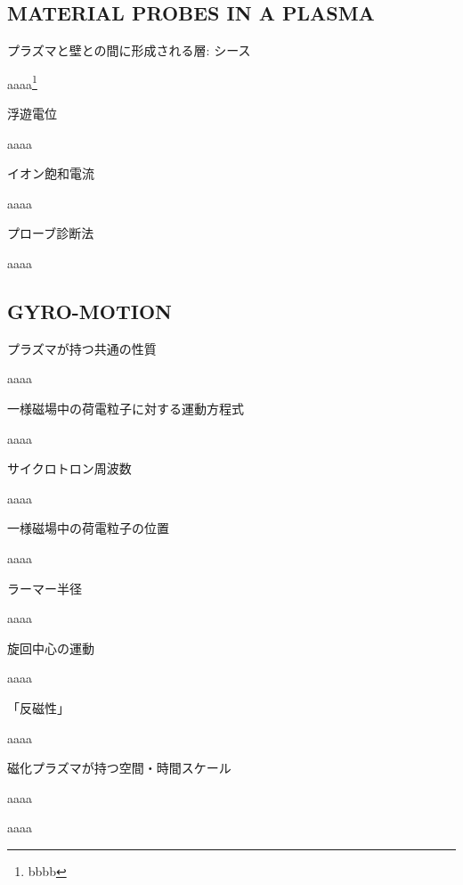 \documentclass[10pt,dvipdfmx,landscape]{jsarticle}
\begin{document}
\subsection{MATERIAL PROBES IN A PLASMA}
\begin{screen}
	プラズマと壁との間に形成される層: シース
\end{screen}
%
aaaa\footnote{bbbb} 
\newpage
\begin{screen}
	浮遊電位
\end{screen}
%
aaaa  
\newpage
\begin{screen}
	イオン飽和電流
\end{screen}
%
aaaa  
\newpage
\begin{screen}
	プローブ診断法
\end{screen}
%
aaaa  
\newpage
\setcounter{section}{2}
\subsection{GYRO-MOTION}
\begin{screen}
	プラズマが持つ共通の性質
\end{screen}
%
aaaa
\newpage
\begin{screen}
	一様磁場中の荷電粒子に対する運動方程式
\end{screen}
%
aaaa  
\newpage
\begin{screen}
	サイクロトロン周波数
\end{screen}
%
aaaa  
\newpage
\begin{screen}
	一様磁場中の荷電粒子の位置
\end{screen}
%
aaaa  
\newpage
\begin{screen}
	ラーマー半径
\end{screen}
%
aaaa  
\newpage
\begin{screen}
	旋回中心の運動
\end{screen}
%
aaaa
\newpage
\begin{screen}
	「反磁性」
\end{screen}
%
aaaa  
\newpage
\begin{screen}
	磁化プラズマが持つ空間・時間スケール
\end{screen}
%
aaaa  
\newpage
\begin{screen}
	
\end{screen}
%
aaaa    
\end{document}
